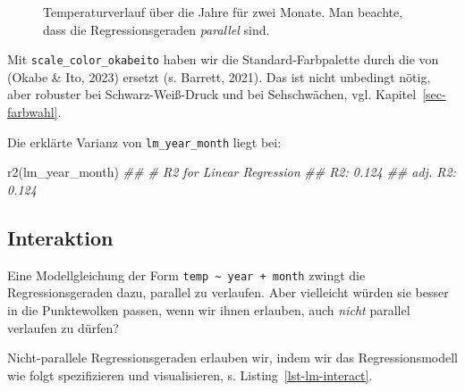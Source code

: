 \documentclass[
  letterpaper,
]{scrbook}
\newenvironment{Shaded}{\begin{snugshade}}{\end{snugshade}}
\newcommand{\DocumentationTok}[1]{\textcolor[rgb]{0.37,0.37,0.37}{\textit{#1}}}
\newcommand{\FunctionTok}[1]{\textcolor[rgb]{0.28,0.35,0.67}{#1}}
\newcommand{\NormalTok}[1]{\textcolor[rgb]{0.00,0.23,0.31}{#1}}
\theoremstyle{definition}
\theoremstyle{definition}
\theoremstyle{definition}
\theoremstyle{remark}
\begin{document}
\begin{figure}


\caption{\label{fig-lm3}Temperaturverlauf über die Jahre für zwei
Monate. Man beachte, dass die Regressionsgeraden \emph{parallel} sind.}

\end{figure}%

Mit \texttt{scale\_color\_okabeito} haben wir die Standard-Farbpalette
durch die von (Okabe \& Ito, 2023) ersetzt (s. Barrett, 2021). Das ist
nicht unbedingt nötig, aber robuster bei Schwarz-Weiß-Druck und bei
Sehschwächen, vgl. Kapitel~\ref{sec-farbwahl}.

Die erklärte Varianz von \texttt{lm\_year\_month} liegt bei:

\begin{Shaded}
\begin{Highlighting}[]
\FunctionTok{r2}\NormalTok{(lm\_year\_month)}
\DocumentationTok{\#\# \# R2 for Linear Regression}
\DocumentationTok{\#\#        R2: 0.124}
\DocumentationTok{\#\#   adj. R2: 0.124}
\end{Highlighting}
\end{Shaded}

\subsection{Interaktion}\label{interaktion}

Eine Modellgleichung der Form
\texttt{temp\ \textasciitilde{}\ year\ +\ month} zwingt die
Regressionsgeraden dazu, parallel zu verlaufen. Aber vielleicht würden
sie besser in die Punktewolken passen, wenn wir ihnen erlauben, auch
\emph{nicht} parallel verlaufen zu dürfen?

Nicht-parallele Regressionsgeraden erlauben wir, indem wir das
Regressionsmodell wie folgt spezifizieren und visualisieren, s.
Listing~\ref{lst-lm-interact}.
\end{document}

